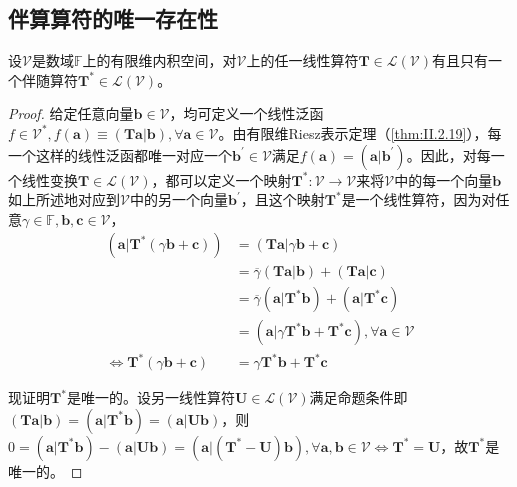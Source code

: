 \documentclass[main.tex]{subfiles}
\begin{document}
\subsection{伴算算符的唯一存在性}\label{sec:A.3.1}
\begin{theorem}
    设$\mathcal{V}$是数域$\mathbb{F}$上的有限维内积空间，对$\mathcal{V}$上的任一线性算符$\mathbf{T}\in\mathcal{L}\left(\mathcal{V}\right)$有且只有一个伴随算符$\mathbf{T}^*\in\mathcal{L}\left(\mathcal{V}\right)$。
\end{theorem}
\begin{proof}
    给定任意向量$\mathbf{b}\in\mathcal{V}$，均可定义一个线性泛函$f\in\mathcal{V}^*,f\left(\mathbf{a}\right)\equiv\left(\mathbf{Ta}|\mathbf{b}\right),\forall\mathbf{a}\in\mathcal{V}$。由有限维Riesz表示定理（\ref{thm:II.2.19}），每一个这样的线性泛函都唯一对应一个$\mathbf{b}^\prime\in\mathcal{V}$满足$f\left(\mathbf{a}\right)=\left(\mathbf{a}|\mathbf{b}^\prime\right)$。因此，对每一个线性变换$\mathbf{T}\in\mathcal{L}\left(\mathcal{V}\right)$，都可以定义一个映射$\mathbf{T}^*:\mathcal{V}\rightarrow\mathcal{V}$来将$\mathcal{V}$中的每一个向量$\mathbf{b}$如上所述地对应到$\mathcal{V}$中的另一个向量$\mathbf{b}^\prime$，且这个映射$\mathbf{T}^*$是一个线性算符，因为对任意$\gamma\in\mathbb{F},\mathbf{b},\mathbf{c}\in\mathcal{V}$，
    \begin{align*}
        \left(\mathbf{a}|\mathbf{T}^*\left(\gamma\mathbf{b}+\mathbf{c}\right)\right) & =\left(\mathbf{Ta}|\gamma\mathbf{b}+\mathbf{c}\right)                                                           \\
                                                                                     & =\overline{\gamma}\left(\mathbf{Ta}|\mathbf{b}\right)+\left(\mathbf{Ta}|\mathbf{c}\right)                       \\
                                                                                     & =\overline{\gamma}\left(\mathbf{a}|\mathbf{T}^*\mathbf{b}\right)+\left(\mathbf{a}|\mathbf{T}^*\mathbf{c}\right) \\
                                                                                     & =\left(\mathbf{a}|\gamma\mathbf{T}^*\mathbf{b}+\mathbf{T}^*\mathbf{c}\right),\forall\mathbf{a}\in\mathcal{V}    \\
        \Leftrightarrow\mathbf{T}^*\left(\gamma\mathbf{b}+\mathbf{c}\right)          & =\gamma\mathbf{T}^*\mathbf{b}+\mathbf{T}^*\mathbf{c}
    \end{align*}

    现证明$\mathbf{T}^*$是唯一的。设另一线性算符$\mathbf{U}\in\mathcal{L}\left(\mathcal{V}\right)$满足命题条件即$\left(\mathbf{Ta}|\mathbf{b}\right)=\left(\mathbf{a}|\mathbf{T}^*\mathbf{b}\right)=\left(\mathbf{a}|\mathbf{Ub}\right)$，则$0=\left(\mathbf{a}|\mathbf{T}^*\mathbf{b}\right)-\left(\mathbf{a}|\mathbf{Ub}\right)=\left(\mathbf{a}|\left(\mathbf{T}^*-\mathbf{U}\right)\mathbf{b}\right),\forall\mathbf{a},\mathbf{b}\in\mathcal{V}\Leftrightarrow\mathbf{T}^*=\mathbf{U}$，故$\mathbf{T}^*$是唯一的。
\end{proof}
\end{document}
